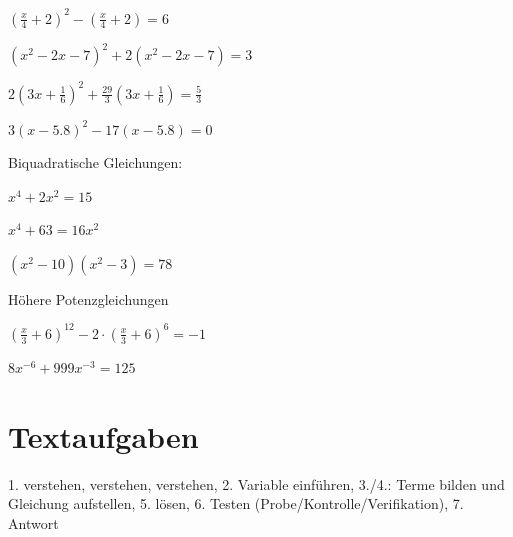 \begin{bbwAufgabenBlock}
\item $\left( \frac{x}4 + 2  \right)^2 - \left( \frac{x}4 + 2 \right) = 6$

\item $\left( x^2-2x-7 \right)^2 + 2 \left(  x^2-2x-7 \right) = 3$

\item $2 \left( 3x+\frac16 \right)^2 +\frac{29}3 \left(  3x+\frac16 \right) = \frac53$

\item $3(x-5.8)^2 - 17(x-5.8) = 0$

Biquadratische Gleichungen:

\item $x^4 + 2x^2 = 15$

\item $x^4 + 63 = 16x^2$


\item $(x^2-10)(x^2-3) = 78$


Höhere Potenzgleichungen

\item $\left(\frac{x}3 + 6 \right)^{12} - 2\cdot{}\left(\frac{x}3 + 6  \right)^6 = -1$

\item $8x^{-6} + 999x^{-3} = 125$


\end{bbwAufgabenBlock}
\newpage




\section{Textaufgaben}

1. verstehen, verstehen, verstehen, 2. Variable einführen, 3./4.: Terme bilden und Gleichung aufstellen,
5. lösen, 6. Testen (Probe/Kontrolle/Verifikation), 7. Antwort

